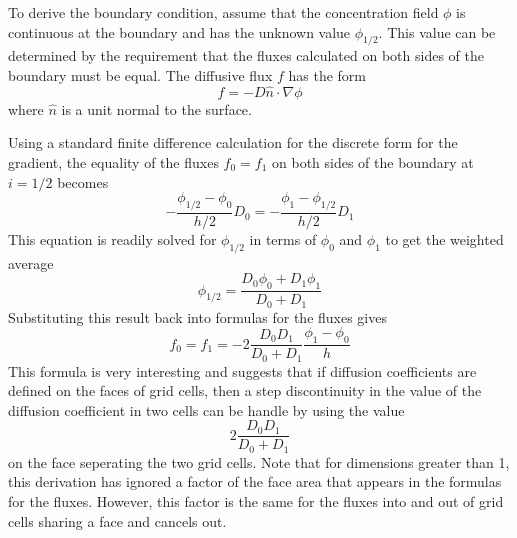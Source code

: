 \documentclass[12pt]{article}
\begin{document}
To derive the boundary condition, assume that the concentration field $\phi$ is
continuous at the boundary and has the unknown value $\phi_{1/2}$. This value
can be determined by the requirement that the fluxes calculated on both sides of
the boundary must be equal. The diffusive flux $f$ has the form
\[
f =-D\hat{n}\cdot\nabla\phi
\]
where $\hat{n}$ is a unit normal to the surface.

Using a standard finite difference calculation for the discrete form for the
gradient, the equality of the fluxes $f_0=f_1$ on both sides of the boundary at $i=1/2$
becomes
\[
-\frac{\phi_{1/2}-\phi_0}{h/2}D_0 = -\frac{\phi_{1}-\phi_{1/2}}{h/2}D_1
\]
This equation is readily solved for $\phi_{1/2}$ in terms of $\phi_0$ and
$\phi_1$ to get the weighted average
\[
\phi_{1/2} = \frac{D_0\phi_0+D_1\phi_1}{D_0+D_1}
\]
Substituting this result back into formulas for the fluxes gives
\[
f_0=f_1=-2\frac{D_0 D_1}{D_0+D_1}\frac{\phi_1-\phi_0}{h}
\]
This formula is very interesting and suggests that if diffusion coefficients are
defined on the faces of grid cells, then a step discontinuity in the value of
the diffusion coefficient in two cells can be handle by using the value
\[
2\frac{D_0 D_1}{D_0+D_1}
\]
on the face seperating the two grid cells. Note that for dimensions greater than 1, this
derivation has ignored a factor of the face area that appears in the formulas for the
fluxes. However, this factor is the same for the fluxes into and out of grid cells
sharing a face and cancels out.
\end{document}

